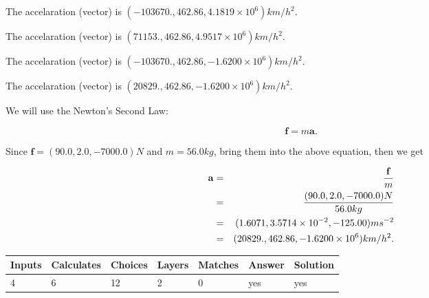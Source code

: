 \documentclass[12pt]{article}
\begin{document}
 
The accelaration (vector) is
$(
-103670.,
462.86 ,
4.1819 \times 10^{6}
)km/h^2.
$
 
 
The accelaration (vector) is
$(
71153.,
462.86 ,
4.9517 \times 10^{6}
)km/h^2.
$
 
 
The accelaration (vector) is
$(
-103670.,
462.86 ,
-1.6200 \times 10^{6}
)km/h^2.
$
 
 
\noindent{}
 
 
The accelaration (vector) is
$(
20829.,
462.86 ,
-1.6200 \times 10^{6}
)km/h^2.
$
 
 
\noindent{}
 
 
 
 
 
 
\noindent{}
 
 

We will use the Newton's Second Law:
 
\[
\mathbf{f}=m\mathbf{a}.
\]
 
Since $\mathbf{f}=( %
90.0,  %
2.0,  %
-7000.0 )N$
and $m= %
56.0 kg$, bring them into the above equation, then we get
 
\begin{eqnarray*}
\mathbf{a}&=&\frac{\mathbf{f}}m  \\
&=&\frac{(
90.0 ,
2.0 ,
-7000.0 )N
}{ %
56.0 kg}  \\
&=&(
1.6071 ,
3.5714 \times 10^{-2},
-125.00
)ms^{-2} \\
&=&(
20829. ,
462.86 ,
-1.6200 \times 10^{6}
)km/h^2.
\end{eqnarray*}
 
 
 
\noindent{}
 
 

 
 
\vspace{0.3in}
   
   
   
   
\noindent\begin{tabular}{|l|l|l|l|l|l|l|}
 \hline
Inputs & Calculates & Choices & Layers & Matches & Answer & Solution \\ \hline
           4  & 
           6  & 
          12
  & 
           2  & 
           0  & 
  yes & 
  yes 
  \\ \hline
 \end{tabular}
   
\end{document}
